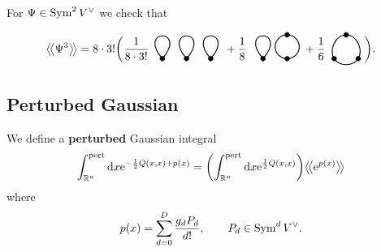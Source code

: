 \begin{example}
  For $\Psi \in \operatorname{Sym}^2 V^\vee$ we check that
  \begin{equation*}
    \bigavg{\Psi^3}
    = 8 \cdot 3! \biggl(
      \frac{1}{8 \cdot 3!} \hspace{-4mm}
      \begin{tikzpicture}[scale=2.5, baseline=2mm]
        \draw[fill=black] (0, 0) circle (.3mm);
        \draw[fill=black] (.3, 0) circle (.3mm);
        \draw[fill=black] (.6, 0) circle (.3mm);
        \draw[thick] (0, 0) to[out=50, in=130, loop] (0, 0);
        \draw[thick] (.3, 0) to[out=50, in=130, loop] (.3, 0);
        \draw[thick] (.6, 0) to[out=50, in=130, loop] (.6, 0);
      \end{tikzpicture}
      \hspace{-4mm} + \frac{1}{8} \hspace{-3mm}
      \begin{tikzpicture}[scale=2.5, baseline=2mm]
        \draw[fill=black] (0, 0) circle (.3mm);
        \draw[fill=black] (.3, 0) circle (.3mm);
        \draw[fill=black] (.3, .3) circle (.3mm);
        \draw[thick] (0, 0) to[out=50, in=130, loop] (0, 0);
        \draw[thick] (.3, .15) circle (1.5mm);
      \end{tikzpicture}
      \hspace{1mm} + \frac{1}{6} \hspace{1mm}
      \begin{tikzpicture}[scale=2.5, baseline=2mm]
        \draw[fill=black] (0, 0) circle (.3mm);
        \draw[fill=black] (.3, 0) circle (.3mm);
        \draw[fill=black] (.15, .3) circle (.3mm);
        \draw[thick] (0, 0) to[out=120, in=180] (.15, .3);
        \draw[thick] (.15, .3) to[out=0, in=60] (.3, 0);
        \draw[thick] (0, 0) to[out=-60, in=240] (.3, 0);
      \end{tikzpicture}
    \biggr).
  \end{equation*}
\end{example}

\subsection{Perturbed Gaussian}

We define a \textbf{perturbed} Gaussian integral
\begin{equation*}
  \int_{\mathbb{R}^n}^\text{pert} \mathrm{d} x \mathrm{e}^{-\frac{1}{2} Q(x, x) + p(x)}
  = \biggl( \int_{\mathbb{R}^n}^\text{pert} \mathrm{d} x \mathrm{e}^{\frac{1}{2} Q(x, x)} \biggr) \big \langle \! \big \langle {\mathrm{e}^{p(x)}} \big \rangle \! \big \rangle
\end{equation*}
where
\begin{equation*}
  p(x) = \sum_{d = 0}^D \frac{g_d P_d}{d!}, \qquad P_d \in \operatorname{Sym}^d V^\vee.
\end{equation*}

